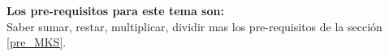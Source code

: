 \label{sec_Ordenes_Magnitud}
\begin{prere}
\label{pre_ord_mag}
\begin{tcolorbox}[colback=blue!5!white,colframe=blue!75!black,boxrule=0.5pt,arc=4pt, left=6pt,right=6pt,top=6pt,bottom=6pt,boxsep=0pt] 
  \textbf{Los pre-requisitos para este tema son:}\\
  Saber sumar, restar, multiplicar, dividir mas los pre-requisitos de la secci\'on \ref{pre_MKS}.
\end{tcolorbox} 
\end{prere}

